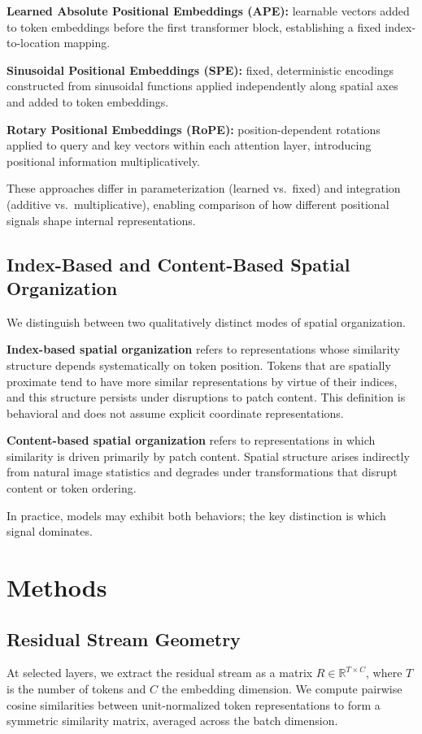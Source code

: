 \documentclass{article}
\begin{document}
\textbf{Learned Absolute Positional Embeddings (APE):} learnable vectors added to token embeddings before the first transformer block, establishing a fixed index-to-location mapping.

\textbf{Sinusoidal Positional Embeddings (SPE):} fixed, deterministic encodings constructed from sinusoidal functions applied independently along spatial axes and added to token embeddings.

\textbf{Rotary Positional Embeddings (RoPE):} position-dependent rotations applied to query and key vectors within each attention layer, introducing positional information multiplicatively.

These approaches differ in parameterization (learned vs.\ fixed) and integration (additive vs.\ multiplicative), enabling comparison of how different positional signals shape internal representations.

\subsection{Index-Based and Content-Based Spatial Organization}

We distinguish between two qualitatively distinct modes of spatial organization.

\textbf{Index-based spatial organization} refers to representations whose similarity structure depends systematically on token position. Tokens that are spatially proximate tend to have more similar representations by virtue of their indices, and this structure persists under disruptions to patch content. This definition is behavioral and does not assume explicit coordinate representations.

\textbf{Content-based spatial organization} refers to representations in which similarity is driven primarily by patch content. Spatial structure arises indirectly from natural image statistics and degrades under transformations that disrupt content or token ordering.

In practice, models may exhibit both behaviors; the key distinction is which signal dominates.

\section{Methods}
\subsection{Residual Stream Geometry}
At selected layers, we extract the residual stream as a matrix $R \in \mathbb{R}^{T \times C}$, where $T$ is the number of tokens and $C$ the embedding dimension. We compute pairwise cosine similarities between unit-normalized token representations to form a symmetric similarity matrix, averaged across the batch dimension.
\end{document}

